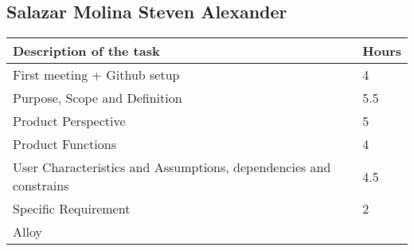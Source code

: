 \subsection{Salazar Molina Steven Alexander}
\begin{center}
\renewcommand{\arraystretch}{1.5}

\begin{tabular}{ |m{7cm}|m{2cm}| } 
 \hline
 \textbf{Description of the task}  & \textbf{Hours} \\
 \hline
 First meeting + Github setup & 4 \\
 \hline
 Purpose, Scope and Definition & 5.5 \\
 \hline
 Product Perspective & 5 \\ 
 \hline
 Product Functions & 4 \\ 
 \hline 
 User Characteristics and Assumptions, dependencies and constrains & 4.5 \\  
 \hline
 Specific Requirement & 2 \\
 \hline
 Alloy & \\
 \hline
\end{tabular}
\end{center}

